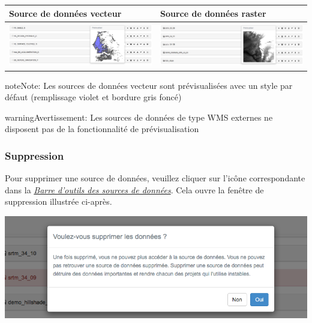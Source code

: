 \documentclass[letterpaper,10pt,french]{sphinxmanual}
\begin{document}
\begin{tabulary}{\linewidth}{|L|L|}
\hline

\textbf{Source de données vecteur}
 & 
\textbf{Source de données raster}
\\
\hline
\includegraphics[width=1.000\linewidth]{preview-vector-window.png}
 & 
\includegraphics[width=1.000\linewidth]{preview-raster-window.png}
\\
\hline\end{tabulary}


\begin{notice}{note}{Note:}
Les sources de données vecteur sont prévisualisées avec un style par défaut (remplissage violet et bordure gris foncé)
\end{notice}

\begin{notice}{warning}{Avertissement:}
Les sources de données de type WMS externes ne disposent pas de la fonctionnalité de prévisualisation
\end{notice}


\subsubsection{Suppression}
\label{data/datasources:suppression}
Pour supprimer une source de données, veuillez cliquer sur l'icône correspondante dans la {\hyperref[data/datasources:datasource-table-label]{\emph{Barre d'outils des sources de données}}}. Cela ouvre la fenêtre de suppression illustrée ci-après.

\includegraphics[width=1.000\linewidth]{delete-datasource-window.png}
\end{document}
